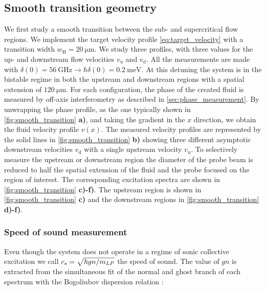 \subsection{Smooth transition geometry}

We first study a smooth transition between the sub- and supercritical flow regions.
We implement the target velocity profile \autoref{eq:target_velocity} with a transition width $w_\mathrm{H}=\SI{20}{\micro\meter}$. 
We study three profiles, with three values for the up- and downstream flow velocities $v_\mathrm{u}$ and $v_\mathrm{d}$.
All the measurements are made with $\delta(0)=\SI{56}{\giga\hertz}\rightarrow \hbar\delta(0)= \SI{0.2}{\milli \electronvolt}$.
At this detuning the system is in the bistable regime in both the upstream and downstream regions with a spatial extension of $\SI{120}{\micro \meter}$.
For each configuration, the phase of the created fluid is measured by off-axis interferometry as described in \autoref{sec:phase_measurement}. By unwrapping the phase profile, as the one typically shown in \autoref{fig:smooth_transition} \textbf{a)}, and taking the gradient in the $x$ direction, we obtain the fluid velocity profile $v(x)$.
The measured velocity profiles are represented by the solid lines in \autoref{fig:smooth_transition} \textbf{\textbf{b)}} showing three different asymptotic downstream velocities $v_\mathrm{d}$ with a single upstream velocity $v_\mathrm{u}$. 
To selectively measure the upstream or downstream region the diameter of the probe beam is reduced to half the spatial extension of the fluid and the probe focused on the region of interest. The corresponding excitation spectra are shown in \autoref{fig:smooth_transition} \textbf{c)-f)}. 
The upstream region is shown in \autoref{fig:smooth_transition} \textbf{c)} and the downstream regions in \autoref{fig:smooth_transition} \textbf{d)-f)}.

\bigskip

\subsubsection{Speed of sound measurement} Even though the system does not operate in a regime of sonic collective excitation we call $c_s=\sqrt{\hbar g n/m_{LP}}$ the speed of sound. The value of $gn$ is extracted 
from the simultaneous fit of the normal and ghost branch of each spectrum with the Bogoliubov dispersion relation :

